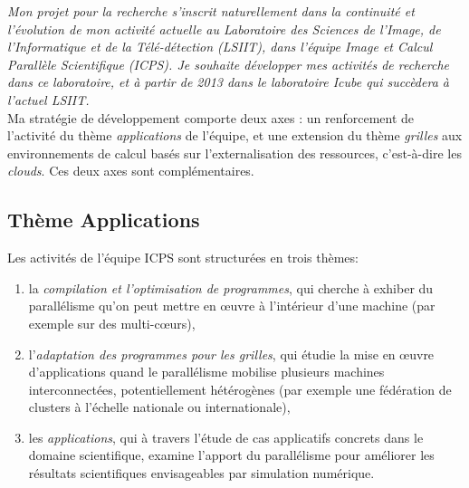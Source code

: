 \documentclass[11pt]{article}
\begin{document}
\textit{%
Mon projet pour la recherche s'inscrit naturellement dans la continuité et 
l'évolution de mon activité actuelle au Laboratoire des Sciences de l'Image,
de l'Informatique et de la Télé-détection (LSIIT), dans l'équipe Image et
Calcul Parallèle Scientifique (ICPS). Je souhaite développer mes activités 
de recherche dans ce laboratoire, et à partir de  2013 dans le laboratoire 
Icube qui succèdera à l'actuel LSIIT.}\\

Ma stratégie de développement comporte deux axes : un renforcement de 
l'activité du thème \textit{applications} de l'équipe, et une extension
du thème \textit{grilles} aux environnements de calcul basés sur 
l'externalisation des ressources, c'est-à-dire les \emph{clouds}. Ces deux
axes sont complémentaires.


\subsection*{Thème Applications}
Les activités de l'équipe ICPS sont structurées en trois thèmes: 
\begin{enumerate}
\item la \textit{compilation et l'optimisation de programmes}, qui 
cherche à exhiber du parallélisme qu'on peut mettre en {\oe}uvre à 
l'intérieur d'une machine (par exemple sur des multi-c{\oe}urs),
\item l'\textit{adaptation des programmes pour les grilles}, qui 
étudie la mise en {\oe}uvre d'applications quand le parallélisme mobilise 
plusieurs machines interconnectées, potentiellement hétérogènes (par 
exemple une fédération de clusters à l'échelle nationale ou internationale), 
\item les \textit{applications}, qui à travers l'étude de cas 
applicatifs concrets dans le domaine scientifique, examine 
l'apport du parallélisme pour améliorer les résultats scientifiques
envisageables par simulation  numérique.
\end{enumerate}
\end{document}

